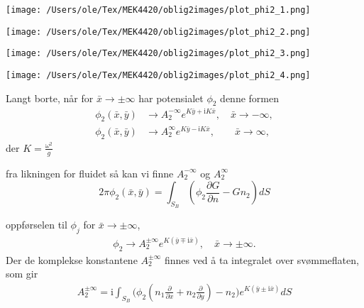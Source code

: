 \documentclass{beamer}
\begin{document}
\begin{frame}
\begin{minipage}[t]{0.45\linewidth}
    \texttt{[image: /Users/ole/Tex/MEK4420/oblig2images/plot\_phi2\_1.png]}
\end{minipage}
\hspace{0.05\linewidth}
\begin{minipage}[t]{0.45\linewidth}
    \texttt{[image: /Users/ole/Tex/MEK4420/oblig2images/plot\_phi2\_2.png]}
\end{minipage}
\begin{minipage}[t]{0.45\linewidth}
    \texttt{[image: /Users/ole/Tex/MEK4420/oblig2images/plot\_phi2\_3.png]}
\end{minipage}
\hspace{0.05\linewidth}
\begin{minipage}[t]{0.45\linewidth}
    \texttt{[image: /Users/ole/Tex/MEK4420/oblig2images/plot\_phi2\_4.png]}
\end{minipage}
\end{frame}

\begin{frame}
Langt borte, når for $\bar{x} \rightarrow \pm \infty$ har potensialet $\phi_2$  denne formen
\begin{align}
	\phi_2(\bar{x},\bar{y}) &\rightarrow A_2^{-\infty} e^{K\bar{y} + \mathrm{i} K\bar{x}}, \quad \bar{x} \rightarrow -\infty, \\
	\phi_2(\bar{x},\bar{y}) &\rightarrow A_2^{\infty} e^{K\bar{y} - \textsf{i} K\bar{x}}, \qquad \bar{x} \rightarrow \infty,
\end{align}
der $K = \frac{\omega^2}{g}$

fra likningen for fluidet så kan vi finne $A_2^{-\infty}$ og $A_2^{\infty}$
\begin{equation}
    2\pi \phi_2(\bar{x},\bar{y})  = \int_{S_B}  ( \phi_2  \frac{\partial G }{\partial n}-G n_2 )dS
\end{equation}

oppførselen til $\phi_j$ for $\bar{x} \rightarrow \pm \infty$,
\begin{align}
\phi_2 \rightarrow A_2^{\pm \infty} e^{K (\bar{y} \mp \mathrm{i}  \bar{x}) }, \quad \bar{x} \rightarrow \pm \infty.
\end{align}
Der de komplekse konstantene $A_2^{\pm \infty}$ finnes ved å ta integralet over svømmeflaten, som gir
\begin{align}
A_2^{\pm \infty} = \mathrm{i} \int_{S_B} \bigg(\phi_2 (n_1 \frac{\partial}{\partial x} + n_2  \frac{\partial}{\partial y}) - n_2 \bigg) e^{K(\bar{y} \pm \mathrm{i} \bar{x})} dS
\end{align}
\end{frame}
\end{document}
